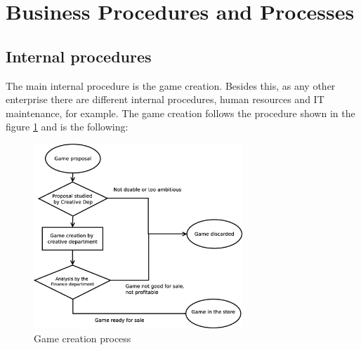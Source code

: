\section{Business Procedures and Processes}




\subsection{Internal procedures}
The main internal procedure is the game creation. Besides this, as any other enterprise there are different internal procedures, human resources and IT maintenance, for example. The game creation follows the procedure shown in the figure \ref{fig:proc_game_creation} and is the following:

\begin{figure}[h] \centering
\includegraphics[width={0.7\textwidth}]{pictures/game_creation_process.eps}
\caption{Game creation process}
\label{fig:proc_game_creation}
\end{figure}

